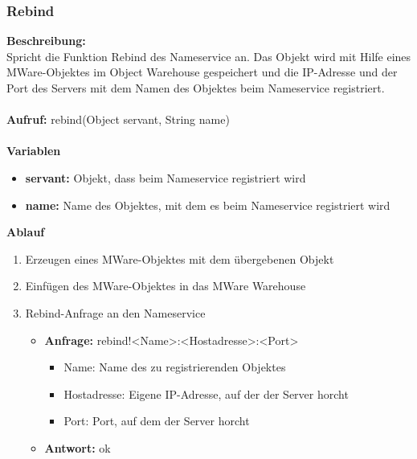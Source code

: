 \subsubsection{Rebind}
\textbf{Beschreibung:}\\
Spricht die Funktion Rebind des Nameservice an. Das Objekt wird mit Hilfe eines MWare-Objektes im Object Warehouse gespeichert und die IP-Adresse und der Port des Servers mit dem Namen des Objektes beim Nameservice registriert. \\ \\
\textbf{Aufruf:} rebind(Object servant, String name)\\ \\
\textbf{Variablen}
\begin{itemize}
\item \textbf{servant:} Objekt, dass beim Nameservice registriert wird
\item \textbf{name:} Name des Objektes, mit dem es beim Nameservice registriert wird
\end{itemize}
\textbf{Ablauf}
\begin{enumerate}
\item Erzeugen eines MWare-Objektes mit dem übergebenen Objekt
\item Einfügen des MWare-Objektes in das MWare Warehouse
\item Rebind-Anfrage an den Nameservice
\begin{itemize}
\item \textbf{Anfrage:} rebind!<Name>:<Hostadresse>:<Port>
\begin{itemize}
\item Name: Name des zu registrierenden Objektes 
\item Hostadresse: Eigene IP-Adresse, auf der der Server horcht
\item Port: Port, auf dem der Server horcht
\end{itemize}
\item \textbf{Antwort:} ok
\end{itemize}
\end{enumerate}

